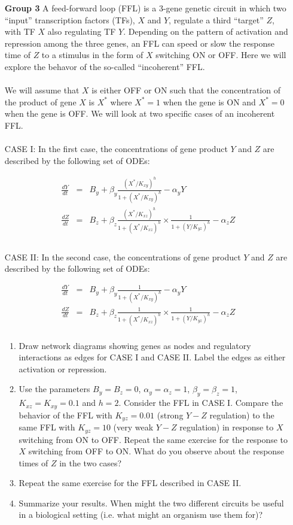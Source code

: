 \documentclass[12pt]{article}
\begin{document}
\begin{enumerate}
\item[\bf Group 3] A feed-forward loop (FFL) is a 3-gene genetic circuit in which two ``input'' transcription factors (TFs), $X$ and $Y$, regulate a third ``target'' $Z$, with TF $X$ also regulating TF $Y$. Depending on the pattern of activation and repression among the three genes, an FFL can speed or slow the response time of $Z$ to a stimulus in the form of $X$ switching ON or OFF. Here we will explore the behavor of the so-called ``incoherent'' FFL.
\\
\\
We will assume that $X$ is either OFF or ON such that the concentration of the product of gene $X$ is $X^*$ where $X^*=1$ when the gene is ON and $X^*=0$ when the gene is OFF. We will look at two specific cases of an incoherent FFL.
\\
\\
CASE I: In the first case, the concentrations of gene product $Y$ and $Z$ are described by the following set of ODEs:

\begin{eqnarray*}
\frac{dY}{dt}&=&B_y+\beta_y\frac{\left(X^*/K_{xy}\right)^h}{1+\left(X^*/K_{xy}\right)^h} -\alpha_yY\\
\frac{dZ}{dt}&=&B_z+\beta_z\frac{\left(X^*/K_{xz}\right)^h}{1+\left(X^*/K_{xz}\right)^h}\times\frac{1}{1+\left(Y/K_{yz}\right)^h} -\alpha_z Z\\
\end{eqnarray*}
\\
CASE II: In the second case, the concentrations of gene product $Y$ and $Z$ are described by the following set of ODEs:

\begin{eqnarray*}
\frac{dY}{dt}&=&B_y+\beta_y\frac{1}{1+\left(X^*/K_{xy}\right)^h} -\alpha_yY\\
\frac{dZ}{dt}&=&B_z+\beta_z\frac{1}{1+\left(X^*/K_{xz}\right)^h} \times \frac{1}{1+\left(Y/K_{yz}\right)^h} -\alpha_z Z\\
\end{eqnarray*}

\begin{enumerate}
\item Draw network diagrams showing genes as nodes and regulatory interactions as edges for CASE I and CASE II. Label the edges as either activation or repression.
\item Use the parameters $B_y=B_z=0$, $\alpha_y=\alpha_z=1$, $\beta_y=\beta_z=1$, $K_{xz}=K_{xy}=0.1$ and $h=2$. Consider the FFL in CASE I. Compare the behavior of the FFL with $K_{yz}=0.01$ (strong $Y-Z$ regulation) to the same FFL with $K_{yz}=10$ (very weak $Y-Z$ regulation) in response to $X$ switching from ON to OFF. Repeat the same exercise for the response to $X$ switching from OFF to ON. What do you observe about the response times of $Z$ in the two cases?
\item Repeat the same exercise for the FFL described in CASE II.
\item Summarize your results. When might the two different circuits be useful in a biological setting (i.e. what might an organism use them for)?
\end{enumerate}



\end{enumerate}
\end{document}

